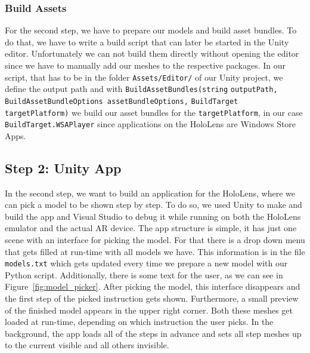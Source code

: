 \subsubsection{Build Assets}
For the second step, we have to prepare our models and build asset bundles. To do that, we have to write a build script that can later be started in the Unity editor. Unfortunately we can not build them directly without opening the editor since we have to manually add our meshes to the respective packages. In our script, that has to be in the folder \verb|Assets/Editor/| of our Unity project, we define the output path and with \verb|BuildAssetBundles(string| \verb|outputPath, BuildAssetBundleOptions assetBundleOptions,| \newline
\verb|BuildTarget targetPlatform)| we build our asset bundles for the \newline \verb|targetPlatform|, in our case \verb|BuildTarget.WSAPlayer| since applications on the HoloLens are Windows Store Apps.

\subsection{Step 2: Unity App}

In the second step, we want to build an application for the HoloLens, where we can pick a model to be shown step by step. To do so, we used Unity to make and build the app and Visual Studio to debug it while running on both the HoloLens emulator and the actual AR device.  \newline
The app structure is simple, it has just one scene with an interface for picking the model. For that there is a drop down menu that gets filled at run-time with all models we have. This information is in the file \verb|models.txt| which gets updated every time we prepare a new model with our Python script. Additionally, there is some text for the user, as we can see in Figure~\ref{fig:model_picker}. \newline 
After picking the model, this interface disappears and the first step of the picked instruction gets shown. Furthermore, a small preview of the finished model appears in the upper right corner. Both these meshes get loaded at run-time, depending on which instruction the user picks. In the background, the app loads all of the steps in advance and sets all step meshes up to the current visible and all others invisible.

